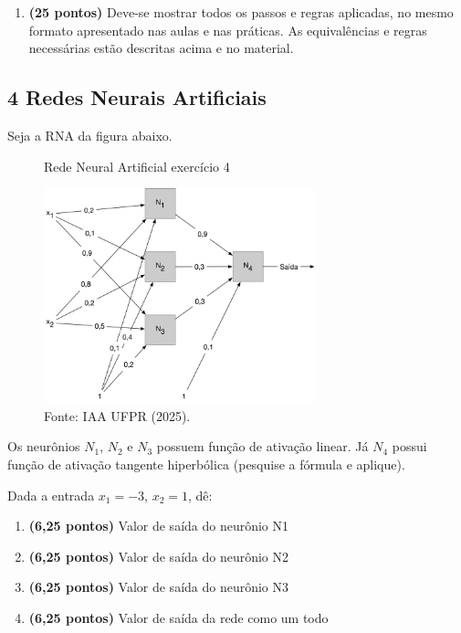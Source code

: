     \begin{enumerate}[label=\alph*)]
        \item \textbf{(25 pontos)} Deve-se mostrar todos os passos e regras aplicadas, no mesmo formato apresentado nas aulas e nas práticas. As equivalências e regras necessárias estão descritas acima e no material.
    \end{enumerate}

\subsection*{\textbf{4 Redes Neurais Artificiais}}
    Seja a RNA da figura abaixo.
    
    \begin{figure}[H]
        \centering
        \caption{Rede Neural Artificial exercício 4}
        \includegraphics[width=0.7\textwidth]{apendices/fig/1_IAA001_3.png} 
        \caption*{Fonte: IAA UFPR (2025).}
    \end{figure}

    Os neurônios $N_1$, $N_2$ e $N_3$ possuem função de ativação linear. Já $N_4$ possui função de ativação tangente hiperbólica (pesquise a fórmula e aplique).

    Dada a entrada $x_1 = -3$, $x_2 = 1$, dê:
    \begin{enumerate}[label=\alph*)]
        \item \textbf{(6,25 pontos)} Valor de saída do neurônio N1
        \item \textbf{(6,25 pontos)} Valor de saída do neurônio N2
        \item \textbf{(6,25 pontos)} Valor de saída do neurônio N3
        \item \textbf{(6,25 pontos)} Valor de saída da rede como um todo
    \end{enumerate}

